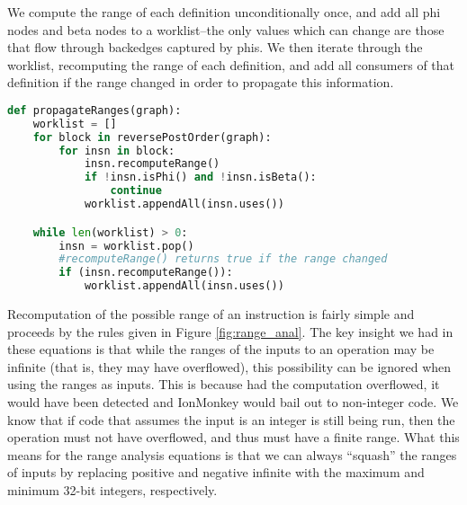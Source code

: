 \documentclass{article}
\begin{document}
We compute the range of each definition unconditionally once, and add all phi
nodes and beta nodes to a worklist--the only values which can change are those
that flow through backedges captured by phis. We then iterate through the
worklist, recomputing the range of each definition, and add all consumers of
that definition if the range changed in order to propagate this information.

\begin{lstlisting}[language=Python,
                   caption={Pseudocode algorithm for propagating range information},
                   label={lst:propagate_ranges}]
def propagateRanges(graph):
    worklist = []
    for block in reversePostOrder(graph):
        for insn in block:
            insn.recomputeRange()
            if !insn.isPhi() and !insn.isBeta():
                continue
            worklist.appendAll(insn.uses())

    while len(worklist) > 0:
        insn = worklist.pop()
        #recomputeRange() returns true if the range changed
        if (insn.recomputeRange()):
            worklist.appendAll(insn.uses())
\end{lstlisting}

Recomputation of the possible range of an instruction is fairly simple
and proceeds by the rules given in Figure \ref{fig:range_anal}. The
key insight we had in these equations is that while the ranges of the
inputs to an operation may be infinite (that is, they may have
overflowed), this possibility can be ignored when using the ranges as
inputs. This is because had the computation overflowed, it would have
been detected and IonMonkey would bail out to non-integer code. We
know that if code that assumes the input is an integer is still being
run, then the operation must not have overflowed, and thus must have a
finite range. What this means for the range analysis equations is that
we can always ``squash'' the ranges of inputs by replacing positive
and negative infinite with the maximum and minimum 32-bit integers,
respectively.
\end{document}

